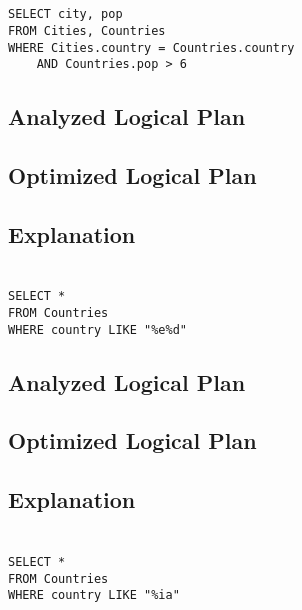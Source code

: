 \documentclass[12pt]{article}
\begin{document}
\section{}
\begin{verbatim}
SELECT city, pop
FROM Cities, Countries
WHERE Cities.country = Countries.country
    AND Countries.pop > 6
\end{verbatim}

\subsection*{Analyzed Logical Plan}
\vspace{2in}

\subsection*{Optimized Logical Plan}
\vspace{2in}

\subsection*{Explanation}

\newpage

\section{}
\begin{verbatim}
SELECT *
FROM Countries
WHERE country LIKE "%e%d"
\end{verbatim}

\subsection*{Analyzed Logical Plan}
\vspace{2in}

\subsection*{Optimized Logical Plan}
\vspace{2in}

\subsection*{Explanation}

\newpage

\section{}
\begin{verbatim}
SELECT *
FROM Countries
WHERE country LIKE "%ia"
\end{verbatim}
\end{document}
